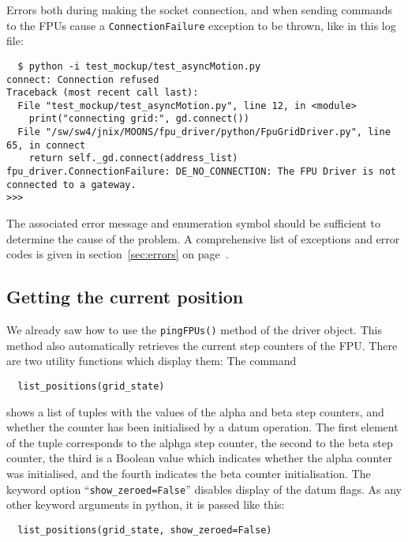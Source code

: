 \documentclass{scrartcl}[12pt,a4paper]
\begin{document}
Errors both during making the socket connection, and when sending
commands to the FPUs cause a \texttt{ConnectionFailure} exception to
be thrown, like in this log file:

\begin{verbatim}
  $ python -i test_mockup/test_asyncMotion.py 
connect: Connection refused
Traceback (most recent call last):
  File "test_mockup/test_asyncMotion.py", line 12, in <module>
    print("connecting grid:", gd.connect())
  File "/sw/sw4/jnix/MOONS/fpu_driver/python/FpuGridDriver.py", line 65, in connect
    return self._gd.connect(address_list)
fpu_driver.ConnectionFailure: DE_NO_CONNECTION: The FPU Driver is not connected to a gateway.
>>> 
\end{verbatim}


The associated error message and enumeration symbol should be
sufficient to determine the cause of the problem. A comprehensive list
of exceptions and error codes is given in section~\ref{sec:errors} on
page~\pageref{sec:errors}.





\subsection{Getting the current position}

We already saw how to use the \texttt{pingFPUs()} method of the driver
object. This method also automatically retrieves the current step
counters of the FPU.  There are two utility functions which display
them: The command

\begin{verbatim}
  list_positions(grid_state)
\end{verbatim}

shows a list of tuples with the values of the alpha and beta step
counters, and whether the counter has been initialised by a datum
operation. The first element of the tuple corresponds to the alphga
step counter, the second to the beta step counter, the third is a
Boolean value which indicates whether the alpha counter was
initialised, and the fourth indicates the beta counter
initialisation. The keyword option ``\texttt{show\_zeroed=False}''
disables display of the datum flags.  As any other keyword arguments
in python, it is passed like this:

\begin{verbatim}
  list_positions(grid_state, show_zeroed=False)
\end{verbatim}
\end{document}
